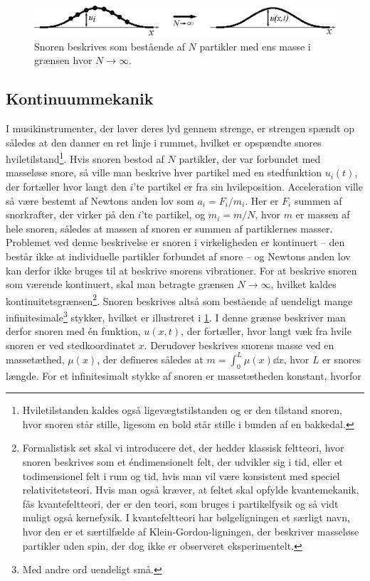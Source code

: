 \begin{figure}[t]
    \centering
    \includegraphics[width=\textwidth]{Akustik/fig/kontinuum.eps}
    \caption{Snoren beskrives som bestående af $N$ partikler med ens masse i grænsen hvor $N\rightarrow\infty$.}
    \label{aku:fig:kontinuum}
\end{figure}
\subsection{Kontinuummekanik}
I musikinstrumenter, der laver deres lyd gennem strenge, er strengen spændt op således at den danner en ret linje i rummet, hvilket er opspændte snores hviletilstand\footnote{Hviletilstanden kaldes også ligevægtstilstanden og er den tilstand snoren, hvor snoren står stille, ligesom en bold står stille i bunden af en bakkedal.}. Hvis snoren bestod af $N$ partikler, der var forbundet med masseløse snore, så ville man beskrive hver partikel med en stedfunktion $u_i(t)$, der fortæller hvor langt den $i$'te partikel er fra sin hvileposition. Acceleration ville så være bestemt af Newtons anden lov som $a_i = F_i/m_i$. Her er $F_i$ summen af snorkrafter, der virker på den $i$'te partikel, og $m_i = m/N$, hvor $m$ er massen af hele snoren, således at massen af snoren er summen af partiklernes masser. Problemet ved denne beskrivelse er snoren i virkeligheden er kontinuert -- den består ikke at individuelle partikler forbundet af snore -- og Newtons anden lov kan derfor ikke bruges til at beskrive snorens vibrationer. For at beskrive snoren som værende kontinuert, skal man betragte grænsen $N \rightarrow \infty$, hvilket kaldes kontinuitetsgrænsen\footnote{Formalistisk set skal vi introducere det, der hedder klassisk feltteori, hvor snoren beskrives som et éndimensionelt felt, der udvikler sig i tid, eller et todimensionel felt i rum og tid, hvis man vil være konsistent med speciel relativitetsteori. Hvis man også kræver, at feltet skal opfylde kvantemekanik, fås kvantefeltteori, der er den teori, som bruges i partikelfysik og så vidt muligt også kernefysik. I kvantefeltteori har bølgeligningen et særligt navn, hvor den er et særtilfælde af Klein-Gordon-ligningen, der beskriver masseløse partikler uden spin, der dog ikke er observeret eksperimentelt.}. Snoren beskrives altså som bestående af uendeligt mange infinitesimale\footnote{Med andre ord uendeligt små.} stykker, hvilket er illustreret i \cref{aku:fig:kontinuum}. I denne grænse beskriver man derfor snoren med én funktion, $u(x,t)$, der fortæller, hvor langt væk fra hvile snoren er ved stedkoordinatet $x$. Derudover beskrives snorens masse ved en massetæthed, $\mu(x)$, der defineres således at $m = \int_0^L\mu(x)\dd{x}$, hvor $L$ er snores længde. For et infinitesimalt stykke af snoren er massetætheden konstant, hvorfor
